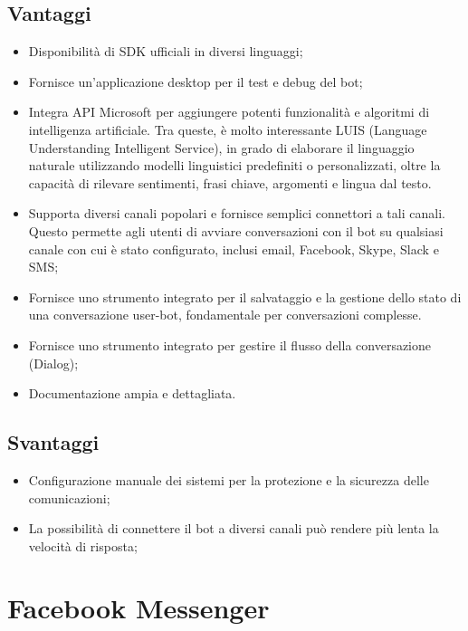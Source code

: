 \documentclass[11pt,notitlepage]{article}
\begin{document}
\subsection*{Vantaggi}
\begin{itemize}
		\item Disponibilità di SDK ufficiali in diversi linguaggi;
		\item Fornisce un'applicazione desktop per il test e debug del bot;  
		\item Integra API Microsoft per aggiungere potenti funzionalità e algoritmi di intelligenza artificiale. Tra queste, è molto interessante LUIS  (Language Understanding Intelligent Service), in grado di elaborare il linguaggio naturale utilizzando modelli linguistici predefiniti o personalizzati, oltre la capacità di rilevare sentimenti, frasi chiave, argomenti e lingua dal testo.
		\item Supporta diversi canali popolari e fornisce semplici connettori a tali canali. Questo permette agli utenti di avviare conversazioni con il bot su qualsiasi canale con cui è stato configurato, inclusi email, Facebook, Skype, Slack e SMS;
		\item Fornisce uno strumento integrato per il salvataggio e la gestione dello stato di una conversazione user-bot, fondamentale per conversazioni complesse.
		\item Fornisce uno strumento integrato per gestire il flusso della conversazione (Dialog);
		\item Documentazione ampia e dettagliata.
\end{itemize} 

\subsection*{Svantaggi}
\begin{itemize}
		\item Configurazione manuale dei sistemi per la protezione e la sicurezza delle comunicazioni;
		\item La possibilità di connettere il bot a diversi canali può rendere più lenta la velocità di risposta; 

\end{itemize} 

\bigskip
\section*{Facebook Messenger}
\end{document}
